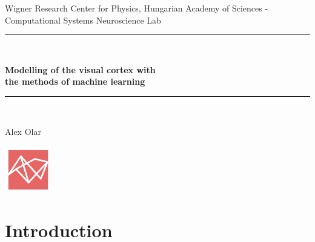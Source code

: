 \documentclass[11pt, english]{article}
\makeatletter
\newcounter{unomenos}
\gdef\@date{ \arabic{unomenos} }
\makeatother
\begin{document}
\begin{titlepage}

\begin{center}
Wigner Research Center for Physics, Hungarian Academy of Sciences - \@date\\
\vspace*{0.15in}
Computational Systems Neuroscience Lab \\
\vspace*{0.4in}
\rule{100mm}{0.1mm}\\
\vspace*{0.3in}
\begin{Large}
\textbf{Modelling of the visual cortex with \\ the methods of machine learning} \\
\end{Large}
\vspace*{0.3in}
\rule{100mm}{0.1mm}\\
\vspace*{0.4in}
\begin{large}
Alex Olar \\
\end{large}
\vfill
\includegraphics[width=2cm]{logoFAC.png}
\end{center}
\end{titlepage}

\newcommand{\CC}{C\nolinebreak\hspace{-.05em}\raisebox{.4ex}{\tiny\bf +}\nolinebreak\hspace{-.10em}\raisebox{.4ex}{\tiny\bf +}}
\def\CC{{C\nolinebreak[4]\hspace{-.05em}\raisebox{.4ex}{\tiny\bf ++}}}

\renewcommand{\thesection}{\Roman{section}.}
\renewcommand{\thesubsection}{\Roman{section}. \arabic{subsection}.}
\renewcommand{\thesubsubsection}{\Roman{section}. \arabic{subsection}.\arabic{subsection}.}

\tableofcontents
\newpage

\section{Introduction}

\vspace{7mm}
\end{document}
